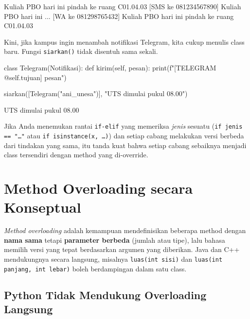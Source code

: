 \begin{keluaran}
 Kuliah PBO hari ini pindah ke ruang C01.04.03
[SMS ke 081234567890] Kuliah PBO hari ini ...
[WA ke 081298765432] Kuliah PBO hari ini pindah ke ruang C01.04.03
\end{keluaran}

Kini, jika kampus ingin menambah notifikasi Telegram, kita cukup menulis class baru. Fungsi \texttt{siarkan()} tidak disentuh sama sekali.

\begin{kode}
class Telegram(Notifikasi):
    def kirim(self, pesan):
        print(f"[TELEGRAM @{self.tujuan}] {pesan}")

siarkan([Telegram("ani_unesa")], "UTS dimulai pukul 08.00")
\end{kode}

\begin{keluaran}
 UTS dimulai pukul 08.00
\end{keluaran}

\begin{tips}
Jika Anda menemukan rantai \texttt{if-elif} yang memeriksa \emph{jenis} sesuatu (\texttt{if jenis == "\ldots"} atau \texttt{if isinstance(x, \ldots)}) dan setiap cabang melakukan versi berbeda dari tindakan yang sama, itu tanda kuat bahwa setiap cabang sebaiknya menjadi class tersendiri dengan method yang di-override.
\end{tips}

\section{Method Overloading secara Konseptual}

\emph{Method overloading} adalah kemampuan mendefinisikan beberapa method dengan \textbf{nama sama} tetapi \textbf{parameter berbeda} (jumlah atau tipe), lalu bahasa memilih versi yang tepat berdasarkan argumen yang diberikan. Java dan C++ mendukungnya secara langsung, misalnya \texttt{luas(int sisi)} dan \texttt{luas(int panjang, int lebar)} boleh berdampingan dalam satu class.

\subsection{Python Tidak Mendukung Overloading Langsung}

